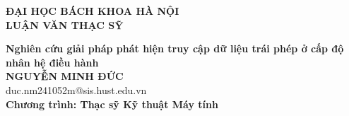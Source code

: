 \documentclass[main.tex]{subfiles}
\begin{document}
\begin{titlepage}
  \thispagestyle{empty}
  \begin{center}

    {\textbf{\large{ĐẠI HỌC BÁCH KHOA HÀ NỘI}}}\\[4cm]

    {\textbf{\huge{LUẬN VĂN THẠC SỸ}}}\\[1cm]
    {\textbf{\Large{Nghiên cứu giải pháp phát hiện truy cập dữ liệu trái phép
      ở cấp độ nhân hệ điều hành}}\\[1cm]

      {\textbf{\large{NGUYỄN MINH ĐỨC}}}\\
      {\large{duc.nm241052m@sis.hust.edu.vn}}\\[0.5cm]

      {\textbf{\large{Chương trình: Thạc sỹ Kỹ thuật Máy tính}}}\\

      \vspace{2cm}
      \begin{table}[H]
        \centering
    \end{table}}
  \end{center}

\end{titlepage}
\end{document}
